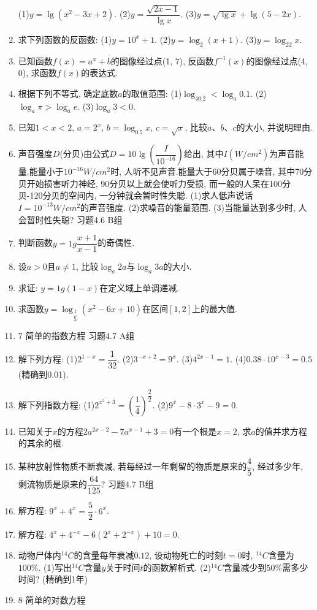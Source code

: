 \documentclass[10pt,a4paper]{article}
\begin{document}
\begin{enumerate}[1.]
(1)$y=\lg (x^2-3x+2)$.				(2)$y=\dfrac{\sqrt {2x-1}}{\lg x}$.
(3)$y=\sqrt {\lg x}+\lg (5-2x)$.
\item 求下列函数的反函数:
(1)$y=10^x+1$.						(2)$y=\log _2(x+1)$.
(3)$y=\log _22x$.
\item 已知函数$f(x)=a^x+b$的图像经过点(1, 7), 反函数$f^{-1}(x)$的图像经过点(4, 0), 求函数$f(x)$的表达式.
\item 根据下列不等式, 确定底数$a$的取值范围:
(1)$\log _40.2<\log _a0.1$.				(2)$\log _a\pi >\log _ae$.
(3)$\log _a3<0$.
\item 已知$1<x<2$, $a=2^x$, $b=\log _{0.5}x$, $c=\sqrt x$, 比较$a$、$b$、$c$的大小, 并说明理由.
\item 声音强度$D$(分贝)由公式$D=10\lg (\dfrac I{10^{-16}})$给出, 其中$I(W/cm^2)$为声音能量.能量小于$10^{-16}W/cm^2$时, 人听不见声音.能量大于60分贝属于噪音, 其中70分贝开始损害听力神经, 90分贝以上就会使听力受损, 而一般的人呆在100分贝-120分贝的空间内, 一分钟就会暂时性失聪.
(1)求人低声说话$I=10^{-13}W/cm^2$的声音强度.
(2)求噪音的能量范围.
(3)当能量达到多少时, 人会暂时性失聪?
习题4.6  B组
\item 判断函数$y=1g\dfrac{x+1}{x-1}$的奇偶性.
\item 设$a>0$且$a\ne 1$, 比较$\log _a2a$与$\log _a3a$的大小.
\item 求证: $y=1g(1-x)$在定义域上单调递减.
\item 求函数$y=\log _{\dfrac 15}(x^2-6x+10)$在区间$[1,2]$上的最大值.
\item 7  简单的指数方程
习题4.7  A组
\item 解下列方程:
(1)$2^{1-x}=\dfrac 1{32}$.						(2)$3^{-x+2}=9^x$.
(3)$4^{2x-1}=1$.						(4)$0.38\cdot 10^{x-3}=0.5$(精确到0.01).
\item 解下列指数方程:
(1)$2^{x^2+3}=(\dfrac 14)^{\dfrac 22}$.					(2)$9^x-8\cdot 3^x-9=0$.
\item 已知关于$x$的方程$2a^{2x-2}-7a^{x-1}+3=0$有一个根是$x=2$, 求$a$的值并求方程的其余的根.
\item 某种放射性物质不断衰减, 若每经过一年剩留的物质是原来的$\dfrac 45$, 经过多少年, 剩流物质是原来的$\dfrac{64}{125}$?
习题4.7  B组
\item 解方程: $9^x+4^x=\dfrac 52\cdot 6^x$.
\item 解方程: $4^x+4^{-x}-6(2^x+2^{-x})+10=0$.
\item 动物尸体内$^{14}C$的含量每年衰减$0.12$, 设动物死亡的时刻$t=0$时, $^{14}C$含量为$100\%$.
(1)写出$^{14}C$含量$y$关于时间$t$的函数解析式.
(2)$^{14}C$含量减少到$50\%$需多少时间? (精确到1年)
\item 8  简单的对数方程

\end{enumerate}
\end{document}
